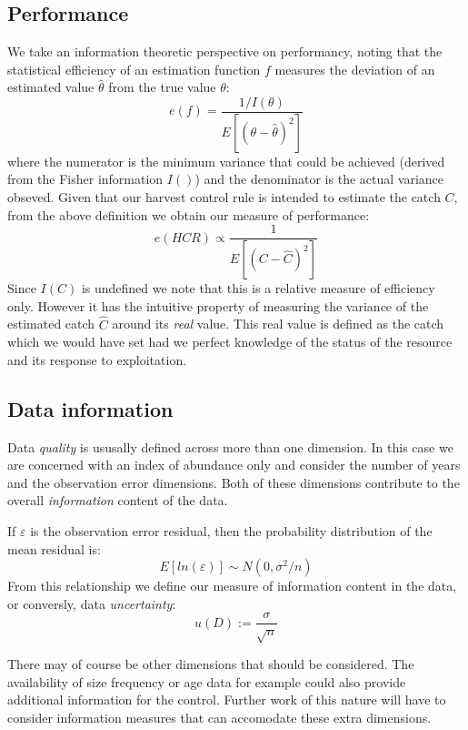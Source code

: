 \documentclass[11pt]{article} %
\begin{document}
\subsection{Performance}
We take an information theoretic perspective on performancy, noting that the statistical efficiency of an estimation function $f$ measures the deviation of an estimated value $\hat{\theta}$ from the true value $\theta$:
\begin{equation}
e(f) = \frac{1/I(\theta)}{E[(\theta - \hat{\theta})^2]}
\end{equation}
where the numerator is the minimum variance that could be achieved (derived from the Fisher information $I()$) and the denominator is the actual variance obseved. Given that our harvest control rule is intended to estimate the catch $C$, from the above definition we obtain our measure of performance:
\begin{equation}
e(HCR) \propto \frac{1}{E[(C - \hat{C})^2]}
\label{eq:ehcr}
\end{equation}
Since $I(C)$ is undefined we note that this is a relative measure of efficiency only. However it has the intuitive property of measuring the variance of the estimated catch $\hat{C}$ around its \textit{real} value. This real value is defined as the catch which we would have set had we perfect knowledge of the status of the resource and its response to exploitation. 

\subsection{Data information}
Data \textit{quality} is ususally defined across more than one dimension. In this case we are concerned with an index of abundance only and consider the number of years and the observation error dimensions. Both of these dimensions contribute to the overall \textit{information} content of the data.

If $\varepsilon$ is the observation error residual, then the probability distribution of the mean residual is:
\begin{equation}
E[ln(\varepsilon)] \sim N\left(0,\sigma^2/n\right)
\end{equation}
From this relationship we define our measure of information content in the data, or conversly, data \textit{uncertainty}:
\begin{equation}
u(D) := \frac{\sigma}{\sqrt{n}}
\label{eq:datauncertainty}
\end{equation}

There may of course be other dimensions that should be considered. The availability of size frequency or age data for example could also provide additional information for the control. Further work of this nature will have to consider information measures that can accomodate these extra dimensions.
\end{document}
